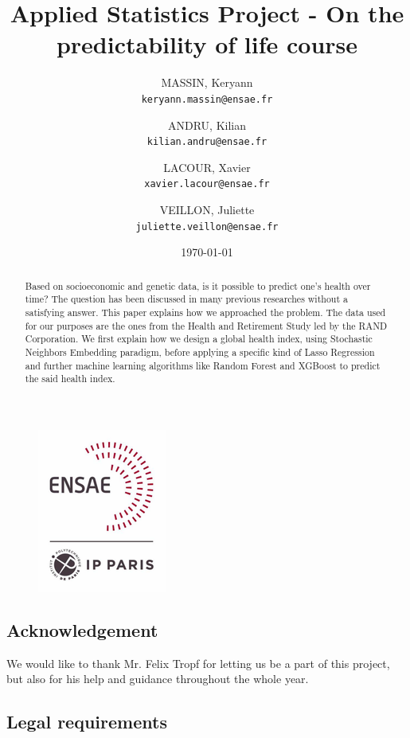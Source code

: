 \documentclass[]{article}
\title{Applied Statistics Project - On the predictability of life course}
\author{
	MASSIN, Keryann\\
	\texttt{keryann.massin@ensae.fr}
	\and
	ANDRU, Kilian\\
	\texttt{kilian.andru@ensae.fr}
	\and
	LACOUR, Xavier\\
	\texttt{xavier.lacour@ensae.fr}
	\and
	VEILLON, Juliette\\
	\texttt{juliette.veillon@ensae.fr}
}
\date{\today}
\begin{document}
\newcommand{\sklearn}{\textbf{scikit-learn}}

\maketitle
\thispagestyle{empty}
\begin{abstract}
	Based on socioeconomic and genetic data, is it possible to predict one's health over time? The question has been discussed in many previous researches without a satisfying answer. This paper explains how we approached the problem. The data used for our purposes are the ones from the Health and Retirement Study led by the RAND Corporation. We first explain how we design a global health index, using Stochastic Neighbors Embedding paradigm, before applying a specific kind of Lasso Regression and further machine learning algorithms like Random Forest and XGBoost to predict the said health index.
\end{abstract}
\begin{figure}[!h]
	\centering
	\includegraphics[scale=0.8]{ENSAE_logo.png}
\end{figure}

\newpage
\thispagestyle{empty}
\begin{center}
    \item\section*{Acknowledgement}
\end{center}
We would like to thank Mr. Felix Tropf for letting us be a part of this project, but also for his help and guidance throughout the whole year.

\begin{center}
    \item\section*{Legal requirements}
\end{center}
\end{document}
